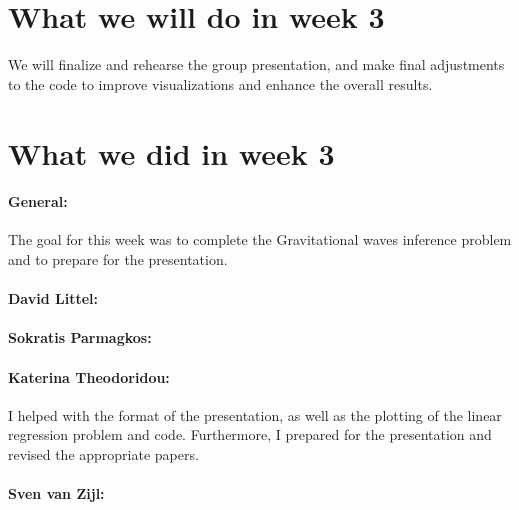 \documentclass{article}
\begin{document}
\section*{What we will do in week 3}
We will finalize and rehearse the group presentation, and make final adjustments to the code to improve visualizations and enhance the overall results.


\section*{What we did in week 3}
\paragraph{General:}
The goal for this week was to complete the Gravitational waves inference problem and to prepare for the presentation.

\paragraph{David Littel:}


\paragraph{Sokratis Parmagkos:}


\paragraph{Katerina Theodoridou:}
I helped with the format of the presentation, as well as the plotting of the linear regression problem and code. Furthermore, I prepared for the presentation and revised the appropriate papers. 

\paragraph{Sven van Zijl:}
\end{document}
